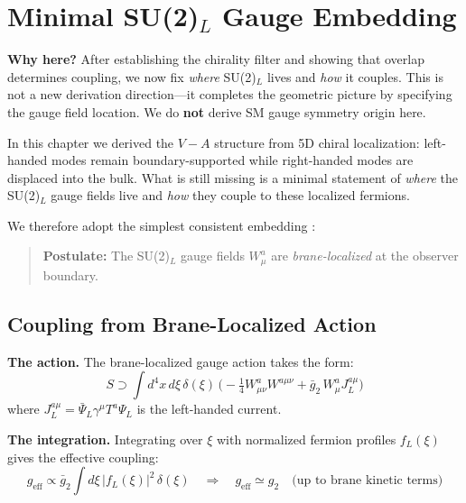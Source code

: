 \section{\texorpdfstring{Minimal SU(2)$_L$ Gauge Embedding}{Minimal SU(2)L Gauge Embedding}}
\label{sec:ch9_su2_embedding}

\textbf{Why here?} After establishing the chirality filter and showing that overlap
determines coupling, we now fix \emph{where} SU(2)$_L$ lives and \emph{how} it couples.
This is not a new derivation direction---it completes the geometric picture by specifying
the gauge field location. We do \textbf{not} derive SM gauge symmetry origin here.

\medskip

In this chapter we derived the $V{-}A$ structure from 5D chiral localization:
left-handed modes remain boundary-supported while right-handed modes are displaced
into the bulk. What is still missing is a minimal statement of \emph{where} the
SU(2)$_L$ gauge fields live and \emph{how} they couple to these localized fermions.

We therefore adopt the simplest consistent embedding \tagP{}:
\begin{quote}
\textbf{Postulate:} The SU(2)$_L$ gauge fields $W_\mu^a$ are \emph{brane-localized}
at the observer boundary.
\end{quote}

\subsection{Coupling from Brane-Localized Action}

\textbf{The action.} The brane-localized gauge action takes the form:
\begin{equation}
    S \supset \int d^4x\,d\xi\,\delta(\xi)\,\Big(-\tfrac{1}{4} W^a_{\mu\nu}W^{a\mu\nu}
    + \bar{g}_2\,W^a_\mu J_L^{a\mu}\Big)
    \label{eq:ch9_brane_gauge_action}
\end{equation}
where $J_L^{a\mu} = \bar\Psi_L \gamma^\mu T^a \Psi_L$ is the left-handed current.

\textbf{The integration.} Integrating over $\xi$ with normalized fermion profiles
$f_L(\xi)$ gives the effective coupling:
\begin{equation}
    g_{\text{eff}} \propto \bar{g}_2 \int d\xi\,|f_L(\xi)|^2\,\delta(\xi)
    \quad\Rightarrow\quad
    g_{\text{eff}} \simeq g_2 \quad \text{(up to brane kinetic terms)}
    \label{eq:ch9_geff}
\end{equation}

